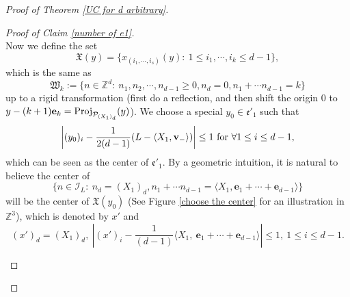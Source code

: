 \documentclass[11pt,reqno,UTF8,twoside]{amsart}
\newcommand{\Z}{\mathbb{Z}}
\newcommand{\bfv}{\mathbf{v}}
\newcommand{\bfe}{\mathbf{e}}
\newcommand{\mcP}{\mathcal{P}}
\newcommand{\mcI}{\mathcal{I}}
\theoremstyle{definition}
\numberwithin{equation}{section}
\begin{document}
\begin{proof}[Proof of Theorem \ref{UC for d arbitrary}]
\begin{proof}[Proof of Claim \ref{number of e1}]
\begin{equation}
  \end{equation}
  Now we define the set
  \[\mathfrak{X}(y)=\{ x_{(i_1,\cdots,i_s)}(y):  \ 1\leq i_1,\cdots,i_k\leq d-1\}, \]
  which is the same as  
  \[\mathfrak{W}_k:= \{n\in\Z^d : \ n_1,n_2,\cdots,n_{d-1}\geq 0,  n_d=0,n_1+\cdots n_{d-1}=k\}\]
   up to a rigid transformation (first do a reflection, and then shift the origin $0$ to $y-(k+1)\bfe_k= {\rm Proj}_{\mcP_{(X_1)_d}}(y)$). We choose a special $y_0\in \mathfrak{e}'_1$ such that 
  \[\left|(y_0)_i -\frac{1}{2(d-1)}(L- \langle X_1 , \bfv_-\rangle  ) \right|\leq 1\ {\rm for}\ \forall 1\leq i\leq d-1,\]
  which can be seen as the center of $\mathfrak{e}'_1$. By a geometric intuition,  it is natural  to believe the center of 
  \[\{  n\in \mcI_L: \ n_d=(X_1)_d, n_1 +\cdots n_{d-1}= \langle X_1,\bfe_1+\cdots + \bfe_{d-1}\rangle  \}\]
  will be the center of $\mathfrak{X}(y_0)$ (See Figure  \ref{choose the center} for an  illustration in $\Z^3$), which is denoted  by  $x'$ and
  \[ (x')_d=(X_1)_d, \ \left|(x')_i -\frac{1}{(d-1)}\langle X_1,\ \bfe_1+\cdots+\bfe_{d-1} \rangle  \right|\leq 1,\ 1\leq i \leq d-1.  \]
  


  \begin{figure}[htbp]
    \centering



\begin{tikzpicture}[x=0.75pt,y=0.75pt,yscale=-0.8,xscale=0.8]


\end{tikzpicture}
\end{figure}
\end{proof}
\end{proof}
\end{document}
